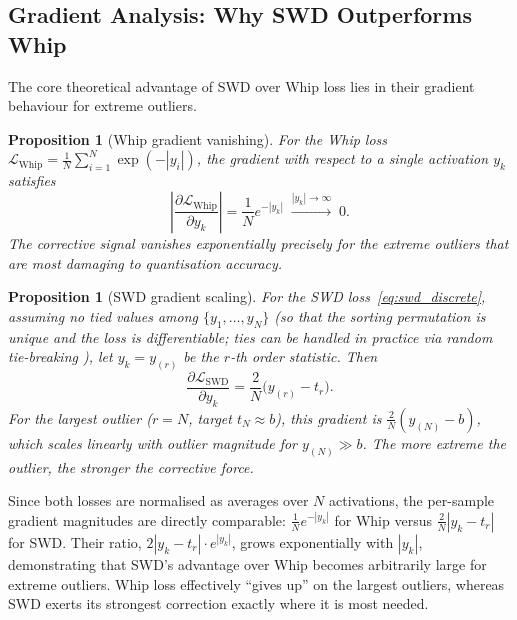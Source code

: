 \documentclass[11pt,a4paper]{article}
\newtheorem{proposition}[theorem]{Proposition}
\begin{document}
\subsection{Gradient Analysis: Why SWD Outperforms Whip}
\label{sec:gradient}

The core theoretical advantage of SWD over Whip loss lies in their gradient behaviour for extreme outliers.

\begin{proposition}[Whip gradient vanishing]
\label{prop:whip_grad}
For the Whip loss $\mathcal{L}_{\mathrm{Whip}} = \frac{1}{N}\sum_{i=1}^{N} \exp(-|y_i|)$, the gradient with respect to a single activation $y_k$ satisfies
\begin{equation}
\label{eq:whip_grad}
\left|\frac{\partial \mathcal{L}_{\mathrm{Whip}}}{\partial y_k}\right| = \frac{1}{N}e^{-|y_k|} \;\xrightarrow{|y_k| \to \infty}\; 0.
\end{equation}
The corrective signal vanishes exponentially precisely for the extreme outliers that are most damaging to quantisation accuracy.
\end{proposition}

\begin{proposition}[SWD gradient scaling]
\label{prop:swd_grad}
For the SWD loss~\eqref{eq:swd_discrete}, assuming no tied values among $\{y_1, \ldots, y_N\}$ (so that the sorting permutation is unique and the loss is differentiable; ties can be handled in practice via random tie-breaking \cite{blondel2020}), let $y_k = y_{(r)}$ be the $r$-th order statistic.
Then
\begin{equation}
\label{eq:swd_grad}
\frac{\partial \mathcal{L}_{\mathrm{SWD}}}{\partial y_k} = \frac{2}{N}\bigl(y_{(r)} - t_r\bigr).
\end{equation}
For the largest outlier ($r = N$, target $t_N \approx b$), this gradient is $\frac{2}{N}(y_{(N)} - b)$, which scales \emph{linearly} with outlier magnitude for $y_{(N)} \gg b$.
The more extreme the outlier, the stronger the corrective force.
\end{proposition}

Since both losses are normalised as averages over $N$ activations, the per-sample gradient magnitudes are directly comparable: $\frac{1}{N}e^{-|y_k|}$ for Whip versus $\frac{2}{N}|y_k - t_r|$ for SWD.
Their ratio, $2|y_k - t_r| \cdot e^{|y_k|}$, grows exponentially with $|y_k|$, demonstrating that SWD's advantage over Whip becomes arbitrarily large for extreme outliers.
Whip loss effectively ``gives up'' on the largest outliers, whereas SWD exerts its strongest correction exactly where it is most needed.
\end{document}
